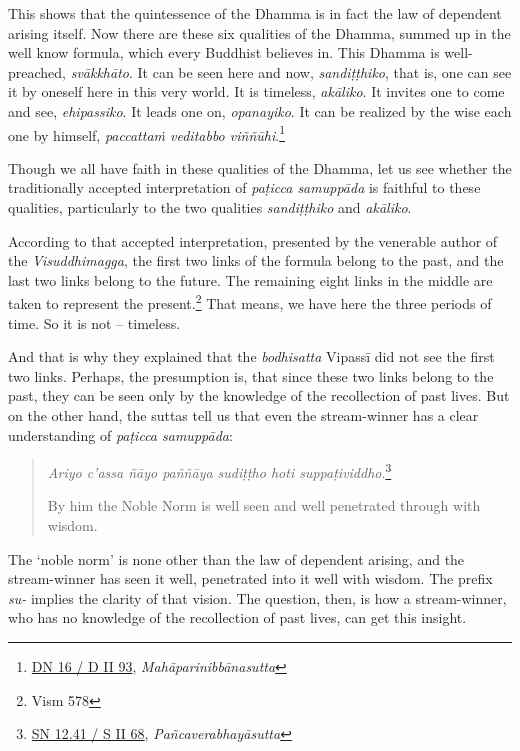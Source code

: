 This shows that the quintessence of the Dhamma is in fact the law of dependent arising itself. Now there are these six qualities of the Dhamma, summed up in the well know formula, which every Buddhist believes in. This Dhamma is well-preached, \emph{svākkhāto}. It can be seen here and now, \emph{sandiṭṭhiko}, that is, one can see it by oneself here in this very world. It is timeless, \emph{akāliko}. It invites one to come and see, \emph{ehipassiko}. It leads one on, \emph{opanayiko}. It can be realized by the wise each one by himself, \emph{paccattaṁ veditabbo viññūhi}.\footnote{\href{https://suttacentral.net/dn16/pli/ms}{DN 16 / D II 93}, \emph{Mahāparinibbānasutta}}

Though we all have faith in these qualities of the Dhamma, let us see whether the traditionally accepted interpretation of \emph{paṭicca samuppāda} is faithful to these qualities, particularly to the two qualities \emph{sandiṭṭhiko} and \emph{akāliko}.

According to that accepted interpretation, presented by the venerable author of the \emph{Visuddhimagga}, the first two links of the formula belong to the past, and the last two links belong to the future. The remaining eight links in the middle are taken to represent the present.\footnote{Vism 578} That means, we have here the three periods of time. So it is not -- timeless.

And that is why they explained that the \emph{bodhisatta} Vipassī did not see the first two links. Perhaps, the presumption is, that since these two links belong to the past, they can be seen only by the knowledge of the recollection of past lives. But on the other hand, the suttas tell us that even the stream-winner has a clear understanding of \emph{paṭicca samuppāda}:

\begin{quote}
\emph{Ariyo c'assa ñāyo paññāya sudiṭṭho hoti suppaṭividdho}.\footnote{\href{https://suttacentral.net/sn12.41/pli/ms}{SN 12.41 / S II 68}, \emph{Pañcaverabhayāsutta}}

By him the Noble Norm is well seen and well penetrated through with wisdom.
\end{quote}

The `noble norm' is none other than the law of dependent arising, and the stream-winner has seen it well, penetrated into it well with wisdom. The prefix \emph{su-} implies the clarity of that vision. The question, then, is how a stream-winner, who has no knowledge of the recollection of past lives, can get this insight.

